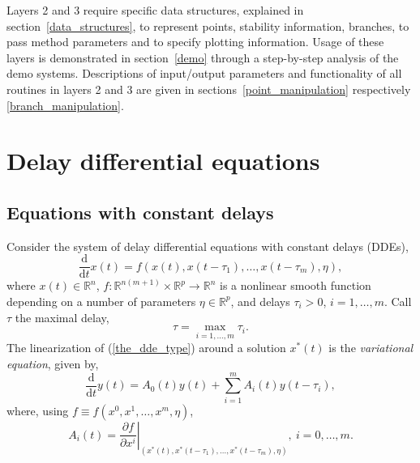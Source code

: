 \documentclass[10pt]{scrartcl}
\newcommand{\define}[1]{\emph{#1}}
\renewcommand{\d}{\mathrm{d}}
\newcommand{\RR}{\mathbb{R}}
\begin{document}
Layers 2 and 3 require specific data structures,
explained in section~\ref{data_structures}, to represent
points, stability information, branches, to pass method 
parameters and to specify plotting information.
Usage of these layers 
is demonstrated in section~\ref{demo}
through a step-by-step analysis of the demo systems.
Descriptions of input/output parameters and functionality
of all routines in layers 2 and 3 are given in 
sections~\ref{point_manipulation}
respectively \ref{branch_manipulation}. 

\section{Delay differential equations}\label{explain_dde}
\label{sec:ddes}
\subsection{Equations with constant delays}\label{dde}

Consider the system of delay differential equations with constant
delays (DDEs),
\begin{equation}\label{the_dde_type}
\frac{\d}{\d t}{x(t)}=f(x(t),x(t-\tau_1),\ldots,x(t-\tau_m),\eta),
\end{equation}
where $x(t)\in\RR^n$, $f:\RR^{n(m+1)}\times\RR^p
\rightarrow\RR^n$ is a nonlinear smooth function
depending on a number of parameters $\eta\in\RR^p$, and delays
$\tau_i>0$, $i=1,\ldots,m$.
Call $\tau$ the maximal delay,
\[
\tau=\max_{i=1,\ldots,m}\tau_i.
\]
The linearization of (\ref{the_dde_type}) around a solution $x^*(t)$ 
is the \define{variational equation}, given by,
\begin{equation}\label{the_var_equa}
\frac{\d}{\d t}{y(t)}=A_0(t)y(t)+\sum_{i=1}^m A_i(t)y(t-\tau_i),
\end{equation}
where, using $f\equiv f(x^0,x^1,\ldots,x^m,\eta)$,  
\begin{equation}\label{A_def}
A_i(t)=\left.\frac{\partial f}{\partial x^i}
\right|_{(x^*(t),x^*(t-\tau_1),\ldots,x^*(t-\tau_m),\eta)}, 
\ i=0,\ldots,m. 
\end{equation}
\end{document}
